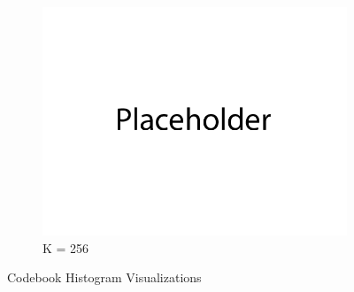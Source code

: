 \documentclass{article}
\begin{document}
\begin{figure}[H]
\begin{subfigure}{0.32\textwidth}
        \includegraphics[width=\textwidth]{figures/q3_codebook_histogram_256}
        \caption{K = 256}
    \end{subfigure}
    \caption{Codebook Histogram Visualizations}
\end{figure}
\end{document}
